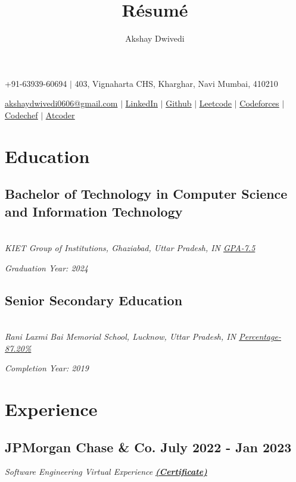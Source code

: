 \documentclass[a4paper,11pt]{article}
\makeatletter
\renewcommand{\maketitle}{
	\begin{center}
		{\Huge \bfseries \textrm{\theauthor}}
		
		+91-63939-60694
		$|$
		403, Vignaharta CHS, Kharghar, Navi Mumbai, 410210
		
		
		\underline{akshaydwivedi0606@gmail.com}
		$|$
		\underline{\href{https://www.linkedin.com/in/akshaydwivedi10}{LinkedIn}}
		$|$
		\underline{\href{https://github.com/akshaynaresh}{Github}} 
		$|$
		\underline{\href{https://leetcode.com/aksnaresh/}{Leetcode}}
		$|$
		\underline{\href{https://codeforces.com/profile/aksnaresh}{Codeforces}}
		$|$
		\underline{\href{https://www.codechef.com/users/aksnaresh}{Codechef}}
		$|$
		\underline{\href{https://atcoder.jp/users/aksnaresh}{Atcoder}}
	
	\end{center}
}
\makeatother
\begin{document}
	\title{R\'esum\'e}
	\author{Akshay Dwivedi}
	\maketitle
	\thispagestyle{empty}



	\section{Education}
	
	\subsection{Bachelor of Technology in Computer Science and Information Technology}
	
    \textsl{\\{\hspace{0.5em}}KIET Group of Institutions, Ghaziabad, Uttar Pradesh, IN \underline{GPA-7.5}}
	
	{\hspace{-1.5em}}\textsl{Graduation Year: 2024}
	
	
	\subsection{Senior Secondary Education}
	
	\textsl{\\Rani Laxmi Bai Memorial School, Lucknow, Uttar Pradesh, IN \underline{Percentage-87.20\%}}
	
	{\hspace{-1.5em}}\textsl{Completion Year: 2019}



    \vspace{-1.1em}



    \section{Experience}

	\subsection{JPMorgan Chase \& Co. \hspace{21em} July 2022 - Jan 2023 \newline}

    \textsl{Software Engineering Virtual Experience} \textsl{\textbf{\href{https://drive.google.com/file/d/1aMeVe3rh78F99NR0c_5v8wemFDOtLfcP/view?usp=share_link}{(Certificate)}}}
\end{document}
